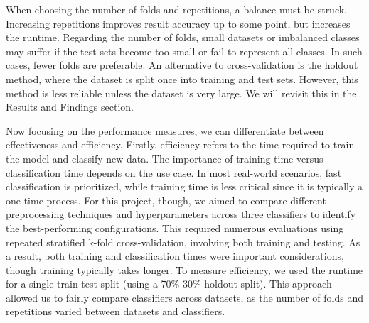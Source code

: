 \documentclass[a4paper,10pt]{article}
\begin{document}
When choosing the number of folds and repetitions, a balance must be struck. Increasing repetitions improves result accuracy up to some point, but increases the runtime. Regarding the number of folds, small datasets or imbalanced classes may suffer if the test sets become too small or fail to represent all classes. In such cases, fewer folds are preferable. An alternative to cross-validation is the holdout method, where the dataset is split once into training and test sets. However, this method is less reliable unless the dataset is very large. We will revisit this in the Results and Findings section.

Now focusing on the performance measures, we can differentiate between effectiveness and efficiency. Firstly, efficiency refers to the time required to train the model and classify new data. The importance of training time versus classification time depends on the use case. In most real-world scenarios, fast classification is prioritized, while training time is less critical since it is typically a one-time process.
For this project, though, we aimed to compare different preprocessing techniques and hyperparameters across three classifiers to identify the best-performing configurations. This required numerous evaluations using repeated stratified k-fold cross-validation, involving both training and testing. As a result, both training and classification times were important considerations, though training typically takes longer. To measure efficiency, we used the runtime for a single train-test split (using a 70\%-30\% holdout split). This approach allowed us to fairly compare classifiers across datasets, as the number of folds and repetitions varied between datasets and classifiers.
\end{document}
